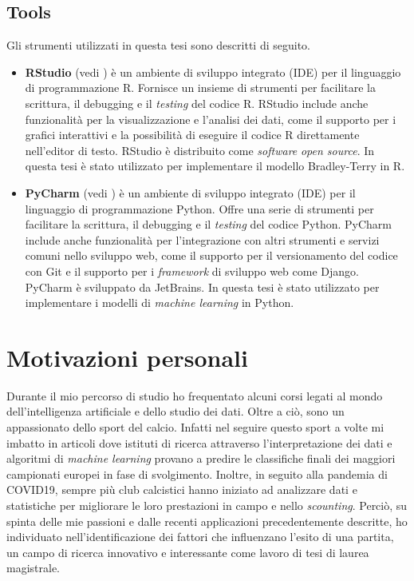 \begin{comment}
library(ggmosaic)
library(ggplot2)
library(gridExtra)
@article{marchiori2020secrets,
	title={Secrets of soccer: Neural network flows and game performance},
	author={Marchiori, Massimo and de Vecchi, Marco},
	journal={Computers \& Electrical Engineering},
	volume={81},
	pages={106505},
	year={2020},
	publisher={Elsevier}
}
\end{comment}

\subsection{Tools}
Gli strumenti utilizzati in questa tesi sono descritti di seguito.
\begin{itemize}
	\item \textbf{RStudio} (vedi \textit{\cite{rstudio}}) è un ambiente di sviluppo integrato (IDE) per il linguaggio di programmazione R. Fornisce un insieme di strumenti per facilitare la scrittura, il debugging e il \emph{testing} del codice R. RStudio include anche funzionalità per la visualizzazione e l'analisi dei dati, come il supporto per i grafici interattivi e la possibilità di eseguire il codice R direttamente nell'editor di testo. RStudio è distribuito come \emph{software} \emph{open source}. In questa tesi è stato utilizzato per implementare il modello Bradley-Terry in R.
	\item \textbf{PyCharm} (vedi \textit{\cite{pycharm}}) è un ambiente di sviluppo integrato (IDE) per il linguaggio di programmazione Python. Offre una serie di strumenti per facilitare la scrittura, il debugging e il \emph{testing} del codice Python. PyCharm include anche funzionalità per l'integrazione con altri strumenti e servizi comuni nello sviluppo web, come il supporto per il versionamento del codice con Git e il supporto per i \emph{framework} di sviluppo web come Django. PyCharm  è sviluppato da JetBrains. In questa tesi è stato utilizzato per implementare i modelli di \emph{machine learning} in Python.
\end{itemize}

\section{Motivazioni personali}
Durante il mio percorso di studio ho frequentato alcuni corsi legati al mondo dell'intelligenza artificiale e dello studio dei dati. Oltre a ciò, sono un appassionato dello sport del calcio. Infatti nel seguire questo sport a volte mi imbatto in articoli dove istituti di ricerca attraverso l'interpretazione dei dati e algoritmi di \emph{machine learning} provano a predire le classifiche finali dei maggiori campionati europei in fase di svolgimento. Inoltre, in seguito alla pandemia di COVID19, sempre più club calcistici hanno iniziato ad analizzare dati e statistiche per migliorare le loro prestazioni in campo e nello \emph{scounting}. Perciò, su spinta delle mie passioni e dalle recenti applicazioni precedentemente descritte, ho individuato nell'identificazione dei fattori che influenzano l'esito di una partita, un campo di ricerca innovativo e interessante come lavoro di tesi di laurea magistrale.
